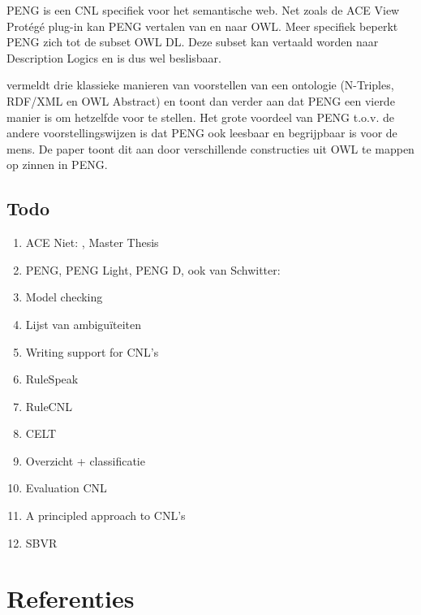 \documentclass[]{article}
\begin{document}
PENG is een CNL specifiek voor het semantische web. Net zoals de ACE View Protégé plug-in kan PENG vertalen van en naar OWL. Meer specifiek beperkt PENG zich tot de subset OWL DL. Deze subset kan vertaald worden naar Description Logics en is dus wel beslisbaar.

\cite{Schwitter2006} vermeldt drie klassieke manieren van voorstellen van een ontologie (N-Triples, RDF/XML en OWL Abstract) en toont dan verder aan dat PENG een vierde manier is om hetzelfde voor te stellen. Het grote voordeel van PENG t.o.v. de andere voorstellingswijzen is dat PENG ook leesbaar en begrijpbaar is voor de mens. De paper toont dit aan door verschillende constructies uit OWL te mappen op zinnen in PENG.

\subsection{Todo}
\begin{enumerate}
  \item ACE\cite{Fuchs2008} Niet: \cite{Fuchs}, Master Thesis\cite{Dellis2010} 
  \item PENG\cite{Schwitter2002, Schwitter2004b, Schwitter2003, Schwitter2006}, PENG Light\cite{Schwitter2008, White2009},
    PENG D\cite{Schwitter2004}, ook van Schwitter:\cite{Schwitter2005} 
  \item Model checking\cite{Flake2002, Konrad2005, Nelken, Jak2008}
  \item Lijst van ambiguïteiten \cite{Berry2003} 
  \item Writing support for CNL's\cite{Kuhn2008} 
  \item RuleSpeak\cite{Ross2009a, Ross2013, Ross2013a, Ross2009} 
  \item RuleCNL\cite{Njonko2014} 
  \item CELT\cite{Pease2010, Dellis2010}
  \item Overzicht + classificatie\cite{Kuhn2014}
  \item Evaluation CNL\cite{Kuhn2010}
  \item A principled approach to CNL's\cite{Kuhn2013} 
  \item SBVR\cite{Spreeuwenberg2010, Levy2013} 
\end{enumerate}
			
\section{Referenties}


\end{document}

